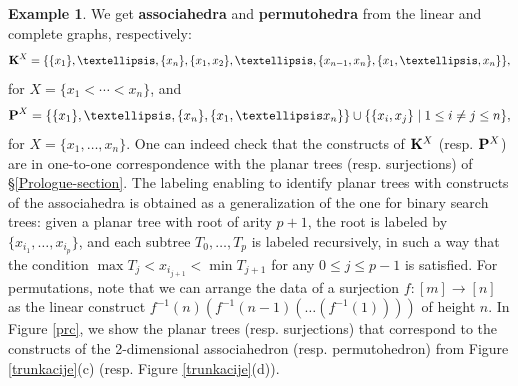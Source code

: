 \documentclass[11pt]{article}
\theoremstyle{definition}
\newtheorem{example}[theo]{Example}
\numberwithin{equation}{section}
\numberwithin{equation}{section}
\newcommand{\set}[1]{\{#1\}}
\newcommand{\setc}[2]{\set{#1 \mid #2}}
\newcommand{\hyper}[1]{{\bf #1}}
\begin{document}
\begin{example}\label{asper}
We  get {\bf associahedra} and {\bf permutohedra} from the  linear  and complete graphs, respectively: 
$$
\hyper{K}^X= \set{\set{x_1},\ldots,\set{x_n},\set{x_1,x_2},\ldots,\set{x_{n-1},x_n},\set{x_1,\ldots, x_n}},$$
for  $X=\set{x_1<\cdots<x_n}$, and
$$\hyper{P}^X= \set{\set{x_1},\ldots,\set{x_n},\set{x_1,\ldots x_n}} \cup \setc{\set{x_i,x_j}}{1\leq i\neq j\leq n},$$
for $X=\set{x_1,\ldots,x_n}$. One can indeed check that the constructs of $\hyper{K}^X$ (resp. $\hyper{P}^X$) are in one-to-one correspondence with  the planar trees (resp.  surjections) of \S\ref{Prologue-section}. The labeling enabling to identify planar trees with constructs of the associahedra is obtained as a generalization of the one for binary search trees: given a planar tree with root of arity $p+1$, the root is labeled by $\set{x_{i_1}, \ldots, x_{i_p}}$, and each subtree $T_0, \ldots, T_p$ is labeled recursively, in such a way that the condition $\max T_j <x_{i_{j+1}}< \min T_{j+1}$ for any $0 \leq j \leq p-1$ is satisfied.
For permutations, note that we can arrange the data of a surjection $f:[m]\rightarrow[n]$ as the linear construct $f^{-1}(n)(f^{-1}(n-1)(\ldots  (f^{-1}(1))))$ of height $n$. In Figure \ref{prc}, we show the planar trees (resp. surjections) that correspond to the constructs of the 2-dimensional associahedron (resp. permutohedron) from Figure \ref{trunkacije}(c) (resp. Figure \ref{trunkacije}(d)).
\begin{figure}
\end{figure}
\end{example}
\end{document}
